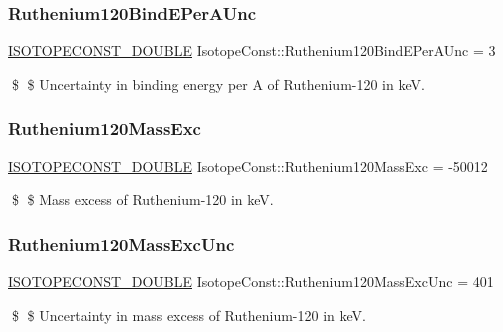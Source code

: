 \subsubsection{\texorpdfstring{Ruthenium120\+Bind\+E\+Per\+A\+Unc}{Ruthenium120BindEPerAUnc}}
{\footnotesize\ttfamily \mbox{\hyperlink{group___isotope_const-_macros_ga8f45a7272ce02c0b4c65c44636ed719a}{I\+S\+O\+T\+O\+P\+E\+C\+O\+N\+S\+T\+\_\+\+D\+O\+U\+B\+LE}} Isotope\+Const\+::\+Ruthenium120\+Bind\+E\+Per\+A\+Unc = 3}

\$ \$ Uncertainty in binding energy per A of Ruthenium-\/120 in keV. \mbox{\label{group___isotope_const-_ruthenium-_ru120_ga2681620b25c8e2884d66f2d403cadfa4}} 
\subsubsection{\texorpdfstring{Ruthenium120\+Mass\+Exc}{Ruthenium120MassExc}}
{\footnotesize\ttfamily \mbox{\hyperlink{group___isotope_const-_macros_ga8f45a7272ce02c0b4c65c44636ed719a}{I\+S\+O\+T\+O\+P\+E\+C\+O\+N\+S\+T\+\_\+\+D\+O\+U\+B\+LE}} Isotope\+Const\+::\+Ruthenium120\+Mass\+Exc = -\/50012}

\$ \$ Mass excess of Ruthenium-\/120 in keV. \mbox{\label{group___isotope_const-_ruthenium-_ru120_ga860327ea1fc107da44b9853fe34c4f3c}} 
\subsubsection{\texorpdfstring{Ruthenium120\+Mass\+Exc\+Unc}{Ruthenium120MassExcUnc}}
{\footnotesize\ttfamily \mbox{\hyperlink{group___isotope_const-_macros_ga8f45a7272ce02c0b4c65c44636ed719a}{I\+S\+O\+T\+O\+P\+E\+C\+O\+N\+S\+T\+\_\+\+D\+O\+U\+B\+LE}} Isotope\+Const\+::\+Ruthenium120\+Mass\+Exc\+Unc = 401}

\$ \$ Uncertainty in mass excess of Ruthenium-\/120 in keV. \mbox{\label{group___isotope_const-_ruthenium-_ru120_gab659be6d75e3a66b749142e8054c17be}} 

